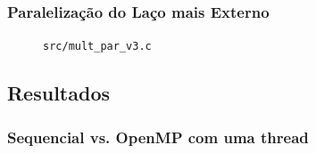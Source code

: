 \documentclass[a4paper, 12pt]{article}
\begin{document}
\subsubsection{Paralelização do Laço mais Externo}

\begin{figure}[H]
    \centering
    
    \caption{\texttt{src/mult\_par\_v3.c}}
    \label{fig:par_v3}
\end{figure}

\subsection{Resultados} \label{sec:res}

\subsubsection{Sequencial vs. OpenMP com uma thread}
\end{document}
